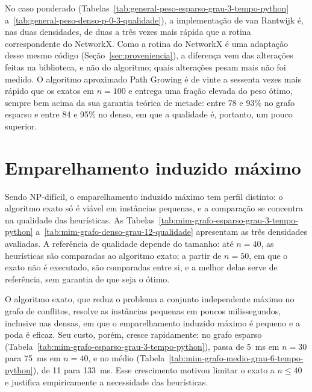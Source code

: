 No caso ponderado
(Tabelas~\ref{tab:general-peso-esparso-grau-3-tempo-python}
a~\ref{tab:general-peso-denso-p-0-3-qualidade}), a implementação de van Rantwijk
é, nas duas densidades, de duas a três vezes mais rápida que a rotina
correspondente do NetworkX. Como a rotina do NetworkX é uma adaptação desse mesmo
código (Seção~\ref{sec:proveniencia}), a diferença vem das alterações feitas na
biblioteca, e não do algoritmo; quais alterações pesam mais não foi medido.
O algoritmo aproximado Path Growing é de vinte a sessenta vezes mais rápido que os
exatos em $n = 100$ e entrega uma fração elevada do peso ótimo, sempre bem acima da
sua garantia teórica de metade: entre 78 e 93\% no grafo esparso e entre 84 e 95\%
no denso, em que a qualidade é, portanto, um pouco superior.

\section{Emparelhamento induzido máximo}
\label{sec:res_mim}

Sendo NP-difícil, o emparelhamento induzido máximo tem perfil distinto: o
algoritmo exato só é viável em instâncias pequenas, e a comparação se concentra na
qualidade das heurísticas. As
Tabelas~\ref{tab:mim-grafo-esparso-grau-3-tempo-python}
a~\ref{tab:mim-grafo-denso-grau-12-qualidade} apresentam as três densidades
avaliadas. A referência de qualidade depende do tamanho: até $n = 40$, as
heurísticas são comparadas ao algoritmo exato; a partir de $n = 50$, em que o exato
não é executado, são comparadas entre si, e a melhor delas serve de referência, sem
garantia de que seja o ótimo.








O algoritmo exato, que reduz o problema a conjunto independente máximo no grafo de
conflitos, resolve as instâncias pequenas em poucos milissegundos, inclusive nas
densas, em que o emparelhamento induzido máximo é pequeno e a poda é eficaz. Seu
custo, porém, cresce rapidamente: no grafo esparso
(Tabela~\ref{tab:mim-grafo-esparso-grau-3-tempo-python}), passa de 5~ms em
$n = 30$ para 75~ms em $n = 40$, e no médio
(Tabela~\ref{tab:mim-grafo-medio-grau-6-tempo-python}), de 11 para 133~ms. Esse
crescimento motivou limitar o exato a $n \le 40$ e justifica empiricamente a
necessidade das heurísticas.

